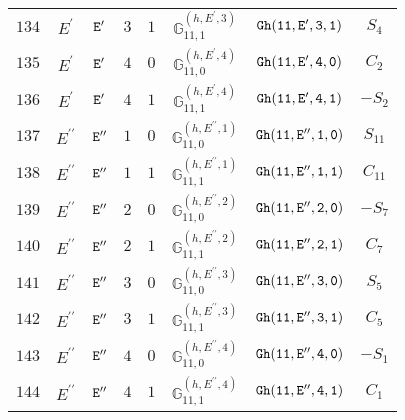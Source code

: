 \documentclass[fleqn,8pt]{jsarticle}
\begin{document}
\begin{table}[ht!]
\begin{center}
\begin{tabular}{cccccccc}
$ 134 $ & $ E^{\prime} $ & $ {\tt E'} $ & $ 3 $ & $ 1 $ & $ \mathbb{G}_{11,1}^{(h,E^{\prime},3)} $ & $ {\tt Gh(11,E',3,1)} $ & $ S_{4} $ \\
$ 135 $ & $ E^{\prime} $ & $ {\tt E'} $ & $ 4 $ & $ 0 $ & $ \mathbb{G}_{11,0}^{(h,E^{\prime},4)} $ & $ {\tt Gh(11,E',4,0)} $ & $ C_{2} $ \\
$ 136 $ & $ E^{\prime} $ & $ {\tt E'} $ & $ 4 $ & $ 1 $ & $ \mathbb{G}_{11,1}^{(h,E^{\prime},4)} $ & $ {\tt Gh(11,E',4,1)} $ & $ - S_{2} $ \\
$ 137 $ & $ E^{\prime\prime} $ & $ {\tt E''} $ & $ 1 $ & $ 0 $ & $ \mathbb{G}_{11,0}^{(h,E^{\prime\prime},1)} $ & $ {\tt Gh(11,E'',1,0)} $ & $ S_{11} $ \\
$ 138 $ & $ E^{\prime\prime} $ & $ {\tt E''} $ & $ 1 $ & $ 1 $ & $ \mathbb{G}_{11,1}^{(h,E^{\prime\prime},1)} $ & $ {\tt Gh(11,E'',1,1)} $ & $ C_{11} $ \\
$ 139 $ & $ E^{\prime\prime} $ & $ {\tt E''} $ & $ 2 $ & $ 0 $ & $ \mathbb{G}_{11,0}^{(h,E^{\prime\prime},2)} $ & $ {\tt Gh(11,E'',2,0)} $ & $ - S_{7} $ \\
$ 140 $ & $ E^{\prime\prime} $ & $ {\tt E''} $ & $ 2 $ & $ 1 $ & $ \mathbb{G}_{11,1}^{(h,E^{\prime\prime},2)} $ & $ {\tt Gh(11,E'',2,1)} $ & $ C_{7} $ \\
$ 141 $ & $ E^{\prime\prime} $ & $ {\tt E''} $ & $ 3 $ & $ 0 $ & $ \mathbb{G}_{11,0}^{(h,E^{\prime\prime},3)} $ & $ {\tt Gh(11,E'',3,0)} $ & $ S_{5} $ \\
$ 142 $ & $ E^{\prime\prime} $ & $ {\tt E''} $ & $ 3 $ & $ 1 $ & $ \mathbb{G}_{11,1}^{(h,E^{\prime\prime},3)} $ & $ {\tt Gh(11,E'',3,1)} $ & $ C_{5} $ \\
$ 143 $ & $ E^{\prime\prime} $ & $ {\tt E''} $ & $ 4 $ & $ 0 $ & $ \mathbb{G}_{11,0}^{(h,E^{\prime\prime},4)} $ & $ {\tt Gh(11,E'',4,0)} $ & $ - S_{1} $ \\
$ 144 $ & $ E^{\prime\prime} $ & $ {\tt E''} $ & $ 4 $ & $ 1 $ & $ \mathbb{G}_{11,1}^{(h,E^{\prime\prime},4)} $ & $ {\tt Gh(11,E'',4,1)} $ & $ C_{1} $ \\
 \hline \hline
\end{tabular}
\end{center}
\end{table}
\end{document}
